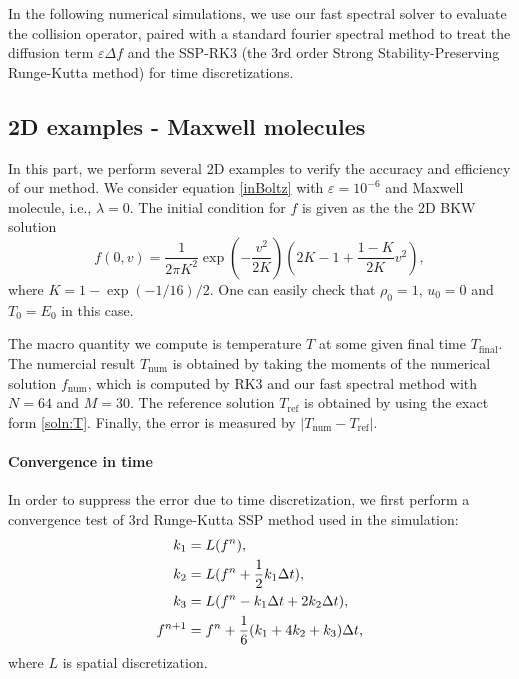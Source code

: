 \documentclass[review, times]{elsarticle}
\begin{document}
In the following numerical simulations, we use our fast spectral solver to evaluate the collision operator, paired with a standard fourier spectral method to treat the diffusion term $\varepsilon\Delta f$ and the SSP-RK3 (the 3rd order Strong Stability-Preserving Runge-Kutta method) \cite{ShuTadmor} for time discretizations.
\subsection{2D examples - Maxwell molecules}

In this part, we perform several 2D examples to verify the accuracy and efficiency of our method. We consider equation \eqref{inBoltz} with $\varepsilon = 10^{-6}$ and Maxwell molecule, i.e., $\lambda = 0$. The initial condition for $f$ is given as the the 2D BKW solution
\begin{equation} \label{ext1}
  f(0,v) = \frac{1}{2\pi K^2}\exp\left(-\frac{v^2}{2K}\right)\left(2K-1+\frac{1-K}{2K}v^2\right),
\end{equation}
where $K=1-\exp(-1/16)/2$. One can easily check that $\rho_0 = 1$, $u_0 = 0$ and $T_0 = E_0$ in this case.

The macro quantity we compute is temperature $T$ at some given final time $T_\text{final}$. The numercial result $T_\text{num}$ is obtained by taking the moments of the numerical solution $f_\text{num}$, which is computed by RK3 and our fast spectral method with $N = 64$ and $M = 30$. The reference solution $T_\text{ref}$ is obtained by using the exact form \eqref{soln:T}. Finally, the error is measured by $|T_\text{num} - T_\text{ref}|$.


\paragraph{\bf Convergence in time} In order to suppress the error due to time discretization, we first perform a convergence test of 3rd Runge-Kutta SSP method used in the simulation:
\begin{align}
  k_1 &= L(f^n), \notag \\
  k_2 &= L(f^n + \frac{1}{2}k_1\Delta t), \notag \\
  k_3 &= L(f^n - k_1\Delta t + 2k_2\Delta t), \notag \\
  f^{n+1} &= f^n + \frac{1}{6}(k_1 + 4k_2 + k_3)\Delta t,
\end{align}
where $L$ is spatial discretization.
\end{document}
